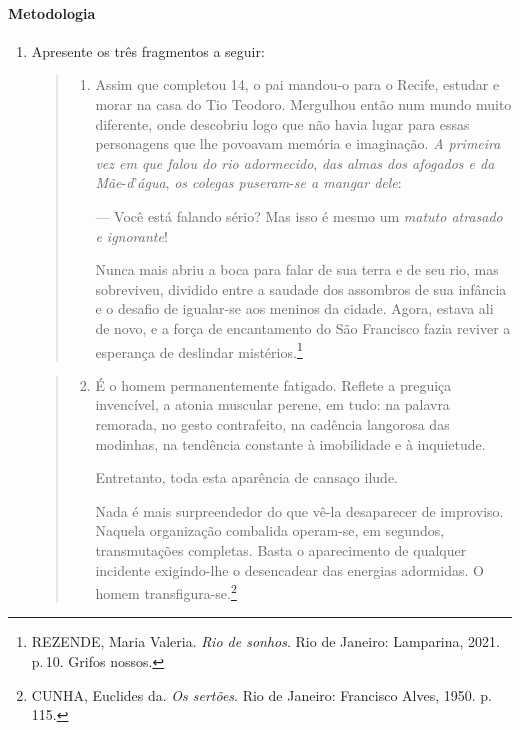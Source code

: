 \documentclass[12pt]{extarticle}
\begin{document}
\paragraph{Metodologia}
\begin{enumerate}
\item Apresente os três fragmentos a seguir:

\begin{quote}
\begin{enumerate}
\item Assim que completou 14, o pai mandou-o para o Recife, estudar e
morar na casa do Tio Teodoro. Mergulhou então num mundo muito
diferente, onde descobriu logo que não havia lugar para essas
personagens que lhe povoavam memória e imaginação. \emph{A primeira
vez em que falou do rio adormecido}, \emph{das almas dos afogados e
da Mãe}-\emph{d}'\emph{água}, \emph{os colegas puseram}-\emph{se a
mangar dele}:

--- Você está falando sério? Mas isso é mesmo um \emph{matuto atrasado
e ignorante}!

Nunca mais abriu a boca para falar de sua terra e de seu rio, mas
sobreviveu, dividido entre a saudade dos assombros de sua infância e
o desafio de igualar-se aos meninos da cidade. Agora, estava ali de
novo, e a força de encantamento do São Francisco fazia reviver a
esperança de deslindar mistérios.\footnote{REZENDE, Maria Valeria. \emph{Rio de sonhos}. Rio de Janeiro: Lamparina, 2021. p.\,10. Grifos nossos.}
\end{enumerate}
\end{quote}

\begin{quote}
\begin{enumerate}
\setcounter{enumii}{1}
\item É o homem permanentemente fatigado. Reflete a preguiça invencível, a
atonia muscular perene, em tudo: na palavra remorada, no gesto
contrafeito, na cadência langorosa das modinhas, na tendência
constante à imobilidade e à inquietude.

Entretanto, toda esta aparência de cansaço ilude.

Nada é mais surpreendedor do que vê-la desaparecer de improviso.
Naquela organização combalida operam-se, em segundos, transmutações
completas. Basta o aparecimento de qualquer incidente exigindo-lhe o
desencadear das energias adormidas. O homem transfigura-se.\footnote{CUNHA, Euclides da. \emph{Os sertões}. Rio de Janeiro: Francisco Alves, 1950. p.\,115.}
\end{enumerate}
\end{quote}


\end{enumerate}
\end{document}

